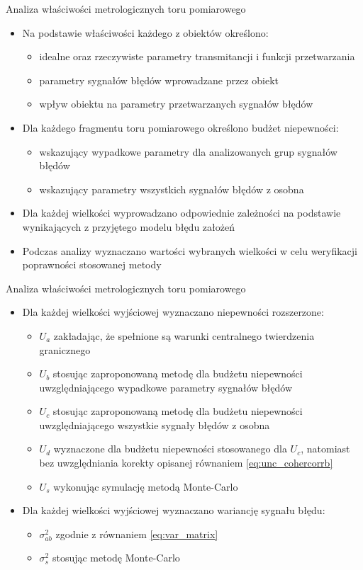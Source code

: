 \documentclass[12pt, polish, aspectratio = 169]{beamer}
\begin{document}
\begin{frame}{Analiza właściwości metrologicznych toru pomiarowego}
\begin{itemize}
\item Na podstawie właściwości każdego z obiektów określono:
	\begin{itemize}
	\item idealne oraz rzeczywiste parametry transmitancji i funkcji przetwarzania
	\item parametry sygnałów błędów wprowadzane przez obiekt
	\item wpływ obiektu na parametry przetwarzanych sygnałów błędów
	\end{itemize}
\item Dla każdego fragmentu toru pomiarowego określono budżet niepewności:
	\begin{itemize}
	\item wskazujący wypadkowe parametry dla analizowanych grup sygnałów błędów
	\item wskazujący parametry wszystkich sygnałów błędów z osobna
	\end{itemize}
\item Dla każdej wielkości wyprowadzano odpowiednie zależności na podstawie wynikających z przyjętego modelu błędu założeń
\item Podczas analizy wyznaczano wartości wybranych wielkości w celu weryfikacji poprawności stosowanej metody
\end{itemize}
\end{frame}

\begin{frame}{Analiza właściwości metrologicznych toru pomiarowego}
\begin{itemize}
\item Dla każdej wielkości wyjściowej wyznaczano niepewności rozszerzone:
	\begin{itemize}
	\item $U_{a}$ zakładając, że spełnione są warunki centralnego twierdzenia granicznego
	\item $U_{b}$ stosując zaproponowaną metodę dla budżetu niepewności uwzględniającego wypadkowe parametry sygnałów błędów
	\item $U_{c}$ stosując zaproponowaną metodę dla budżetu niepewności uwzględniającego wszystkie sygnały błędów z osobna
	\item $U_{d}$ wyznaczone dla budżetu niepewności stosowanego dla $U_{c}$, natomiast bez uwzględniania korekty opisanej równaniem \eqref{eq:unc_cohercorrb}
	\item $U_{s}$ wykonując symulację metodą Monte-Carlo
	\end{itemize}
\item Dla każdej wielkości wyjściowej wyznaczano wariancję sygnału błędu:
	\begin{itemize}
	\item $\sigma^{2}_{ab}$ zgodnie z równaniem \eqref{eq:var_matrix}
	\item $\sigma^{2}_{s}$ stosując metodę Monte-Carlo
	\end{itemize}
\end{itemize}
\end{frame}
\end{document}
